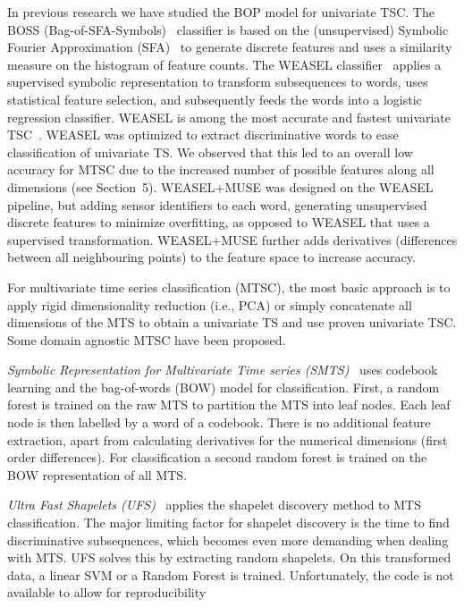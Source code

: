 \documentclass[sigconf]{acmart}
\begin{document}
In previous research we have studied the BOP model for univariate TSC. The BOSS (Bag-of-SFA-Symbols)~\cite{schafer2014boss} classifier is based on the (unsupervised) Symbolic Fourier Approximation (SFA)~\cite{SchaferH12} to generate discrete features and uses a similarity measure on the histogram of feature counts. The WEASEL classifier~\cite{schaefer2017weasel} applies a supervised symbolic representation to transform subsequences to words, uses statistical feature selection, and subsequently feeds the words into a logistic regression classifier. WEASEL is among the most accurate and fastest univariate TSC~\cite{schaefer2017weasel}. WEASEL was optimized to extract discriminative words to ease classification of univariate TS. We observed that this led to an overall low accuracy for MTSC due to the increased number of possible features along all dimensions (see Section~5). WEASEL+MUSE was designed on the WEASEL pipeline, but adding sensor identifiers to each word, generating unsupervised discrete features to minimize overfitting, as opposed to WEASEL that uses a supervised transformation. WEASEL+MUSE further adds derivatives (differences between all neighbouring points) to the feature space to increase accuracy.
 
For multivariate time series classification (MTSC), the most basic approach is to apply rigid dimensionality reduction (i.e., PCA) or simply concatenate all dimensions of the MTS to obtain a univariate TS and use proven univariate TSC. Some domain agnostic MTSC have been proposed. 

\emph{Symbolic Representation for Multivariate Time series (SMTS)}~\cite{baydogan2015learning} uses codebook learning and the bag-of-words (BOW) model for classification. First, a random forest is trained on the raw MTS to partition the MTS into leaf nodes. Each leaf node is then labelled by a word of a codebook. There is no additional feature extraction, apart from calculating  derivatives for the numerical dimensions (first order differences). For classification a second random forest is trained on the BOW representation of all MTS. 

\emph{Ultra Fast Shapelets (UFS)}~\cite{wistuba2015ultra} applies the shapelet discovery method to MTS classification. The major limiting factor for shapelet discovery is the time to find discriminative subsequences, which becomes even more demanding when dealing with MTS. UFS solves this by extracting random shapelets. On this transformed data, a linear SVM or a Random Forest is trained. Unfortunately, the code is not available to allow for reproducibility 
\end{document}
